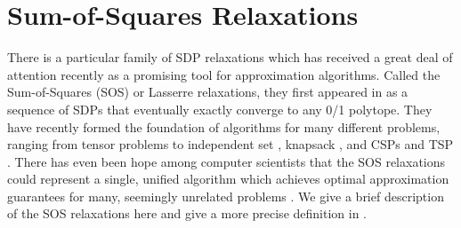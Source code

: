 
\section{Sum-of-Squares Relaxations}
There is a particular family of SDP relaxations which has received a great deal of attention recently as a promising tool for approximation algorithms. Called the Sum-of-Squares (SOS) or Lasserre relaxations, they first appeared in \cite{Parr00,Las01} as a sequence of SDPs that eventually exactly converge to any 0/1 polytope. They have recently formed the foundation of algorithms for many different problems, ranging from tensor problems \cite{TS15,BKS15,HSS15,PS17} to independent set \cite{CS08}, knapsack \cite{KMN10}, and \textsc{CSP}s and \textsc{TSP} \cite{RT12,LRST14}. There has even been hope among computer scientists that the SOS relaxations could represent a single, unified algorithm which achieves optimal approximation guarantees for many, seemingly unrelated problems \cite{BS14}. We give a brief description of the SOS relaxations here and give a more precise definition in .

